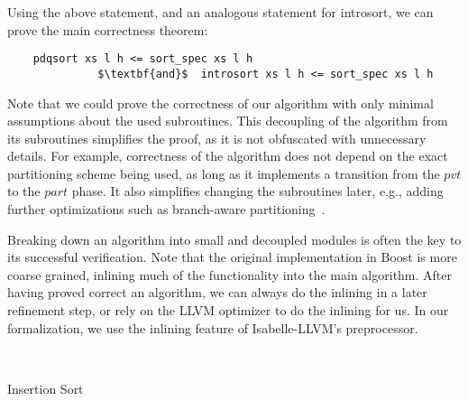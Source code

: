 \documentclass[runningheads]{llncs}
\begin{document}
  Using the above statement, and an analogous statement for introsort, we can prove the main correctness theorem:
  \begin{theorem}\label{thm:sorting_correct}
  \begin{lstlisting}
    pdqsort xs l h <= sort_spec xs l h
              $\textbf{and}$  introsort xs l h <= sort_spec xs l h
  \end{lstlisting}
  \end{theorem}


  Note that we could prove the correctness of our algorithm with only minimal assumptions about the used subroutines.
  This decoupling of the algorithm from its subroutines simplifies the proof, as it is not obfuscated with unnecessary details.
  For example, correctness of the algorithm does not depend on the exact partitioning scheme being used, as long as it implements
  a transition from the \is$pvt$ to the \is$part$ phase. It also simplifies changing the subroutines later, e.g.,
  adding further optimizations such as branch-aware partitioning~\cite{EdWe16}.

  Breaking down an algorithm into small and decoupled modules is often the key to its successful verification.
  Note that the original implementation in Boost is more coarse grained, inlining much of the functionality into the main algorithm.
  After having proved correct an algorithm, we can always do the inlining in a later refinement step, or rely on the LLVM optimizer to do
  the inlining for us. In our formalization, we use the inlining feature of Isabelle-LLVM's preprocessor.

  \begin{algorithm}
  \begin{minipage}{.41\textwidth}
  \begin{algorithmic}[1]
      ~\Return\EndIf
      \EndWhile
    \EndProcedure
  \end{algorithmic}
  \end{minipage}\hfill
  \begin{minipage}{.52\textwidth}
  \begin{algorithmic}[1]
       \label{alg:insert:loophead}
      \EndWhile
    \EndProcedure
  \end{algorithmic}
  \end{minipage}
  \caption{Insertion Sort}\label{alg:insort}
  \end{algorithm}
%
\end{document}
